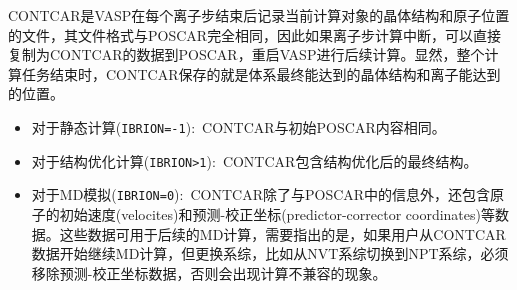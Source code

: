 \textrm{CONTCAR}是\textrm{VASP}在每个离子步结束后记录当前计算对象的晶体结构和原子位置的文件，其文件格式与\textrm{POSCAR}完全相同，因此如果离子步计算中断，可以直接复制为\textrm{CONTCAR}的数据到\textrm{POSCAR}，重启\textrm{VASP}进行后续计算。显然，整个计算任务结束时，\textrm{CONTCAR}保存的就是体系最终能达到的晶体结构和离子能达到的位置。
\begin{itemize}
	\item 对于静态计算(\texttt{IBRION=-1}):~\textrm{CONTCAR}与初始\textrm{POSCAR}内容相同。
	\item 对于结构优化计算(\texttt{IBRION>1}):~\textrm{CONTCAR}包含结构优化后的最终结构。
	\item 对于\textrm{MD}模拟(\texttt{IBRION=0}):~\textrm{CONTCAR}除了与\textrm{POSCAR}中的信息外，还包含原子的初始速度\textrm{(velocites)}和预测-校正坐标\textrm{(predictor-corrector coordinates)}等数据。这些数据可用于后续的\textrm{MD}计算，需要指出的是，如果用户从\textrm{CONTCAR}数据开始继续\textrm{MD}计算，但更换系综，比如从\textrm{NVT}系综切换到\textrm{NPT}系综，必须移除预测-校正坐标数据，否则会出现计算不兼容的现象。
\end{itemize}
%
%
%
%
%
%
%
%
%
%
%

